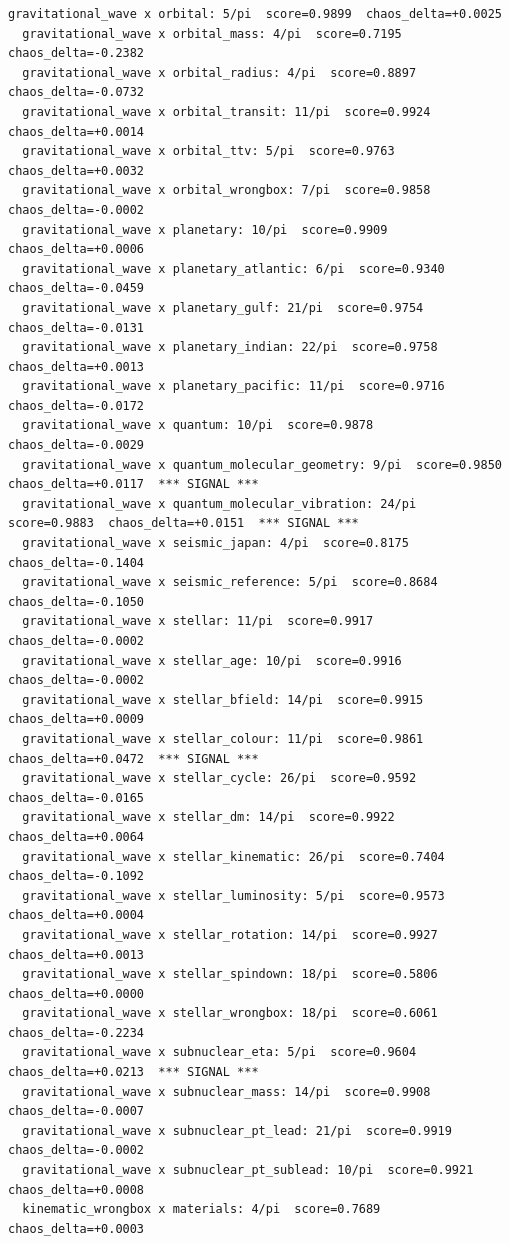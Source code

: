 \documentclass[11pt, letterpaper, openany]{book}
\begin{document}
\begin{empiricalbox}
\begin{lstlisting}[style=terminal]
  gravitational_wave x orbital: 5/pi  score=0.9899  chaos_delta=+0.0025
  gravitational_wave x orbital_mass: 4/pi  score=0.7195  chaos_delta=-0.2382
  gravitational_wave x orbital_radius: 4/pi  score=0.8897  chaos_delta=-0.0732
  gravitational_wave x orbital_transit: 11/pi  score=0.9924  chaos_delta=+0.0014
  gravitational_wave x orbital_ttv: 5/pi  score=0.9763  chaos_delta=+0.0032
  gravitational_wave x orbital_wrongbox: 7/pi  score=0.9858  chaos_delta=-0.0002
  gravitational_wave x planetary: 10/pi  score=0.9909  chaos_delta=+0.0006
  gravitational_wave x planetary_atlantic: 6/pi  score=0.9340  chaos_delta=-0.0459
  gravitational_wave x planetary_gulf: 21/pi  score=0.9754  chaos_delta=-0.0131
  gravitational_wave x planetary_indian: 22/pi  score=0.9758  chaos_delta=+0.0013
  gravitational_wave x planetary_pacific: 11/pi  score=0.9716  chaos_delta=-0.0172
  gravitational_wave x quantum: 10/pi  score=0.9878  chaos_delta=-0.0029
  gravitational_wave x quantum_molecular_geometry: 9/pi  score=0.9850  chaos_delta=+0.0117  *** SIGNAL ***
  gravitational_wave x quantum_molecular_vibration: 24/pi  score=0.9883  chaos_delta=+0.0151  *** SIGNAL ***
  gravitational_wave x seismic_japan: 4/pi  score=0.8175  chaos_delta=-0.1404
  gravitational_wave x seismic_reference: 5/pi  score=0.8684  chaos_delta=-0.1050
  gravitational_wave x stellar: 11/pi  score=0.9917  chaos_delta=-0.0002
  gravitational_wave x stellar_age: 10/pi  score=0.9916  chaos_delta=-0.0002
  gravitational_wave x stellar_bfield: 14/pi  score=0.9915  chaos_delta=+0.0009
  gravitational_wave x stellar_colour: 11/pi  score=0.9861  chaos_delta=+0.0472  *** SIGNAL ***
  gravitational_wave x stellar_cycle: 26/pi  score=0.9592  chaos_delta=-0.0165
  gravitational_wave x stellar_dm: 14/pi  score=0.9922  chaos_delta=+0.0064
  gravitational_wave x stellar_kinematic: 26/pi  score=0.7404  chaos_delta=-0.1092
  gravitational_wave x stellar_luminosity: 5/pi  score=0.9573  chaos_delta=+0.0004
  gravitational_wave x stellar_rotation: 14/pi  score=0.9927  chaos_delta=+0.0013
  gravitational_wave x stellar_spindown: 18/pi  score=0.5806  chaos_delta=+0.0000
  gravitational_wave x stellar_wrongbox: 18/pi  score=0.6061  chaos_delta=-0.2234
  gravitational_wave x subnuclear_eta: 5/pi  score=0.9604  chaos_delta=+0.0213  *** SIGNAL ***
  gravitational_wave x subnuclear_mass: 14/pi  score=0.9908  chaos_delta=-0.0007
  gravitational_wave x subnuclear_pt_lead: 21/pi  score=0.9919  chaos_delta=-0.0002
  gravitational_wave x subnuclear_pt_sublead: 10/pi  score=0.9921  chaos_delta=+0.0008
  kinematic_wrongbox x materials: 4/pi  score=0.7689  chaos_delta=+0.0003

\end{lstlisting}
\end{empiricalbox}
\end{document}
